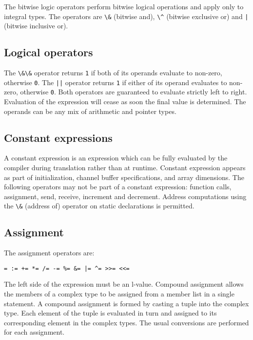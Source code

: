 The bitwise logic operators perform bitwise logical operations and apply
only to integral types. The operators are \passthrough{\lstinline!\&!}
(bitwise and), \passthrough{\lstinline!\^!} (bitwise exclusive or) and
\passthrough{\lstinline!|!} (bitwise inclusive or).

\hypertarget{logical-operators}{%
\subsection{Logical operators}\label{logical-operators}}

The \passthrough{\lstinline!\&\&!} operator returns
\passthrough{\lstinline!1!} if both of its operands evaluate to
non-zero, otherwise \passthrough{\lstinline!0!}. The
\passthrough{\lstinline!||!} operator returns
\passthrough{\lstinline!1!} if either of its operand evaluates to
non-zero, otherwise \passthrough{\lstinline!0!}. Both operators are
guaranteed to evaluate strictly left to right. Evaluation of the
expression will cease as soon the final value is determined. The
operands can be any mix of arithmetic and pointer types.

\hypertarget{constant-expressions}{%
\subsection{Constant expressions}\label{constant-expressions}}

A constant expression is an expression which can be fully evaluated by
the compiler during translation rather than at runtime.
Constant expression appears as part of initialization, channel buffer
specifications, and array dimensions. The following operators may not be
part of a constant expression: function calls, assignment, send,
receive, increment and decrement. Address computations using the
\passthrough{\lstinline!\&!} (address of) operator on static
declarations is permitted.

\hypertarget{assignment}{%
\subsection{Assignment}\label{assignment}}

The assignment operators are:

\begin{lstlisting}
= := += *= /= -= %= &= |= ^= >>= <<= 
\end{lstlisting}

The left side of the expression must be an l-value. Compound assignment
allows the members of a complex type to be assigned from a member list
in a single statement. A compound assignment is formed by casting a
tuple into the complex type. Each element of the tuple is evaluated in
turn and assigned to its corresponding element in the complex types. The
usual conversions are performed for each assignment.

